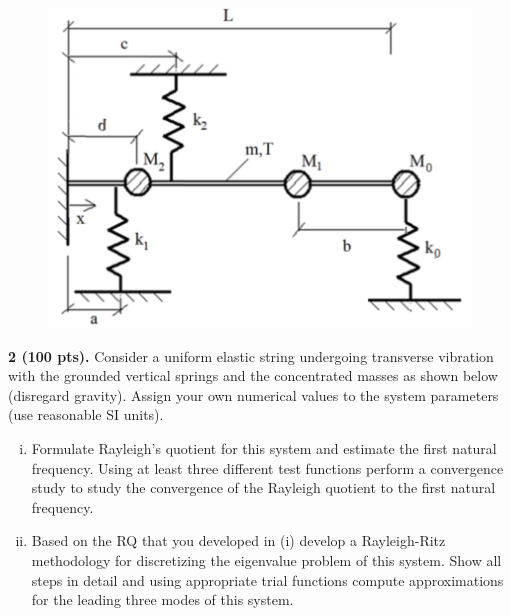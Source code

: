\begin{problem}
    \begin{figure}
        \vspace{0.75cm}
        \centering
        \includegraphics[width=0.95\linewidth]{homework/hw3/assets/hw3_p2.png}
    \end{figure}
    \textbf{2 (100 pts).} Consider a uniform elastic string undergoing transverse vibration with the grounded vertical springs and the concentrated masses as shown below (disregard gravity). 
    Assign your own numerical values to the system parameters (use reasonable SI units).
    \begin{enumerate}[(i)]
    \item {
        Formulate Rayleigh's quotient for this system and estimate the first natural frequency. 
        Using at least three different test functions perform a convergence study to study the convergence of the Rayleigh quotient to the first natural frequency.
    }
    \item {
        Based on the RQ that you developed in (i) develop a Rayleigh-Ritz methodology for discretizing the eigenvalue problem of this system. 
        Show all steps in detail and using appropriate trial functions compute approximations for the leading three modes of this system.
    }
    \end{enumerate}
\end{problem}

